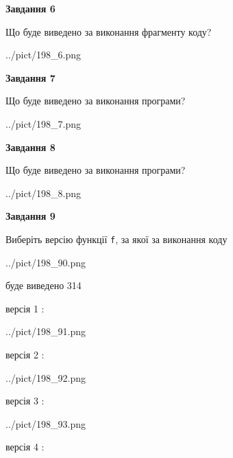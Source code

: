 \documentclass[12pt, ukrainian]{article}
\def\code#1{\Verb!#1!}
\begin{document}
{\begin {large}
{\begin {center}\textbf{Завдання 6}\end {center}}

Що буде виведено за виконання фрагменту коду?\par
\begin{center}
	{../pict/198_6.png}
\end{center}
\newpage

{\begin {center}\textbf{Завдання 7}\end {center}}

Що буде виведено за виконання програми?\par
\begin{center}
	{../pict/198_7.png}
\end{center}
\newpage

{\begin {center}\textbf{Завдання 8}\end {center}}

Що буде виведено за виконання програми?\par
\begin{center}
	{../pict/198_8.png}
\end{center}
\newpage

{\begin {center}\textbf{Завдання 9}\end {center}}

Виберіть версію функції \code{f}, за якої за виконання коду
\begin{center}
	{../pict/198_90.png}
\end{center}
буде виведено 314

\vspace{5mm}
версія 1 :

\begin{center}
	{../pict/198_91.png}
\end{center}
версія 2 :

\begin{center}
	{../pict/198_92.png}
\end{center}
версія 3 :

\begin{center}
	{../pict/198_93.png}
\end{center}
версія 4 :


\end{large}}
\end{document}
